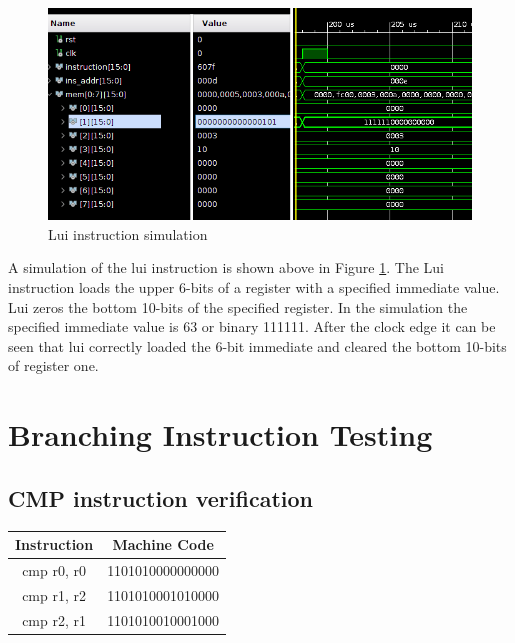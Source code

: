 \documentclass{article}
\begin{document}
		\begin{figure}[H]
			\centering
			\includegraphics[width=5in]{img/luiinstest.png}
			\caption{Lui instruction simulation}
			\label{fig:luiinstest}
		\end{figure}
		
		\begin{par}
			A simulation of the lui instruction is shown above in Figure \ref{fig:luiinstest}. The Lui instruction loads the upper 6-bits of a register with a specified immediate value. Lui zeros the bottom 10-bits of the specified register. In the simulation the specified immediate value is 63 or binary 111111. After the clock edge it can be seen that lui correctly loaded the 6-bit immediate and cleared the bottom 10-bits of register one. 
		\end{par}
		\newpage
		
\section{ Branching Instruction Testing}
	\subsection{CMP instruction verification}
		\vspace{.5cm}
		\begin{center}
			\begin{tabular}{|c|c|}
				\hline 
				\textbf{Instruction} & \textbf{Machine Code} \\ 
				\hline 
				cmp r0, r0 & 1101010000000000 \\ 
				cmp	r1, r2 & 1101010001010000 \\
				cmp	r2, r1 & 1101010010001000 \\
				\hline 
			\end{tabular} 
		\end{center}
		
\end{document}
